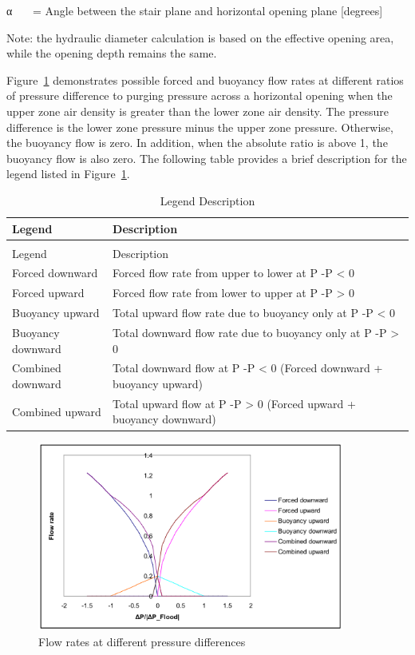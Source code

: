 α~~~ = Angle between the stair plane and horizontal opening plane {[}degrees{]}

Note: the hydraulic diameter calculation is based on the effective opening area, while the opening depth remains the same.

Figure~\ref{fig:flow-rates-at-different-pressure-differences} demonstrates possible forced and buoyancy flow rates at different ratios of pressure difference to purging pressure across a horizontal opening when the upper zone air density is greater than the lower zone air density. The pressure difference is the lower zone pressure minus the upper zone pressure. Otherwise, the buoyancy flow is zero. In addition, when the absolute ratio is above 1, the buoyancy flow is also zero. The following table provides a brief description for the legend listed in Figure~\ref{fig:flow-rates-at-different-pressure-differences}.

\begin{longtable}[c]{p{1.5in}p{4.5in}}
\caption{Legend Description \label{table:legend-description}} \tabularnewline
\toprule 
Legend & Description \tabularnewline \midrule
\endfirsthead

\caption[]{Legend Description} \tabularnewline
\toprule 
Legend & Description \tabularnewline \midrule
\endhead

Forced downward & Forced flow rate from upper to lower at P  -P    <  0 \tabularnewline
Forced upward & Forced flow rate from lower to upper at P  -P    >  0 \tabularnewline
Buoyancy upward & Total upward flow rate due to buoyancy only at P  -P    <  0 \tabularnewline
Buoyancy downward & Total downward flow rate due to buoyancy only at P  -P    >  0 \tabularnewline
Combined downward & Total downward flow at P  -P    <  0 (Forced downward + buoyancy upward) \tabularnewline
Combined upward & Total upward flow at P  -P    >  0 (Forced upward + buoyancy downward) \tabularnewline
\bottomrule
\end{longtable}

\begin{figure}[hbtp] %
\centering
\includegraphics[width=0.9\textwidth, height=0.9\textheight, keepaspectratio=true]{media/image2743.svg.png}
\caption{Flow rates at different pressure differences \protect \label{fig:flow-rates-at-different-pressure-differences}}
\end{figure}

